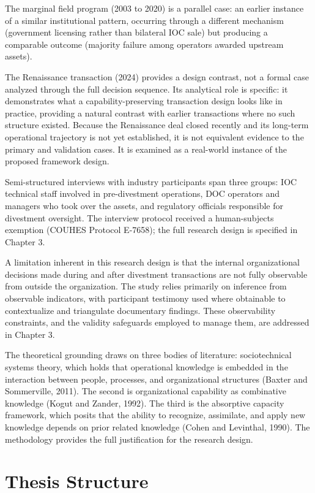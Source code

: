 \documentclass[twoside,fontset=lmodern]{mitthesis}
\begin{document}
The marginal field program (2003 to 2020) is a parallel case: an earlier
instance of a similar institutional pattern, occurring through a
different mechanism (government licensing rather than bilateral IOC
sale) but producing a comparable outcome (majority failure among
operators awarded upstream assets).

The Renaissance transaction (2024) provides a design contrast, not a
formal case analyzed through the full decision sequence. Its analytical
role is specific: it demonstrates what a capability-preserving
transaction design looks like in practice, providing a natural contrast
with earlier transactions where no such structure existed. Because the
Renaissance deal closed recently and its long-term operational
trajectory is not yet established, it is not equivalent evidence to the
primary and validation cases. It is examined as a real-world instance of
the proposed framework design.

Semi-structured interviews with industry participants span three groups:
IOC technical staff involved in pre-divestment operations, DOC operators
and managers who took over the assets, and regulatory officials
responsible for divestment oversight. The interview protocol received a
human-subjects exemption (COUHES Protocol E-7658); the full research
design is specified in Chapter 3.

A limitation inherent in this research design is that the internal
organizational decisions made during and after divestment transactions
are not fully observable from outside the organization. The study relies
primarily on inference from observable indicators, with participant
testimony used where obtainable to contextualize and triangulate
documentary findings. These observability constraints, and the validity
safeguards employed to manage them, are addressed in Chapter 3.

The theoretical grounding draws on three bodies of literature:
sociotechnical systems theory, which holds that operational knowledge is
embedded in the interaction between people, processes, and
organizational structures (Baxter and Sommerville, 2011). The second is
organizational capability as combinative knowledge (Kogut and Zander,
1992). The third is the absorptive capacity framework, which posits that
the ability to recognize, assimilate, and apply new knowledge depends on
prior related knowledge (Cohen and Levinthal, 1990). The methodology
provides the full justification for the research design.

\hypertarget{thesis-structure}{%
\section{Thesis Structure}\label{thesis-structure}}
\end{document}
